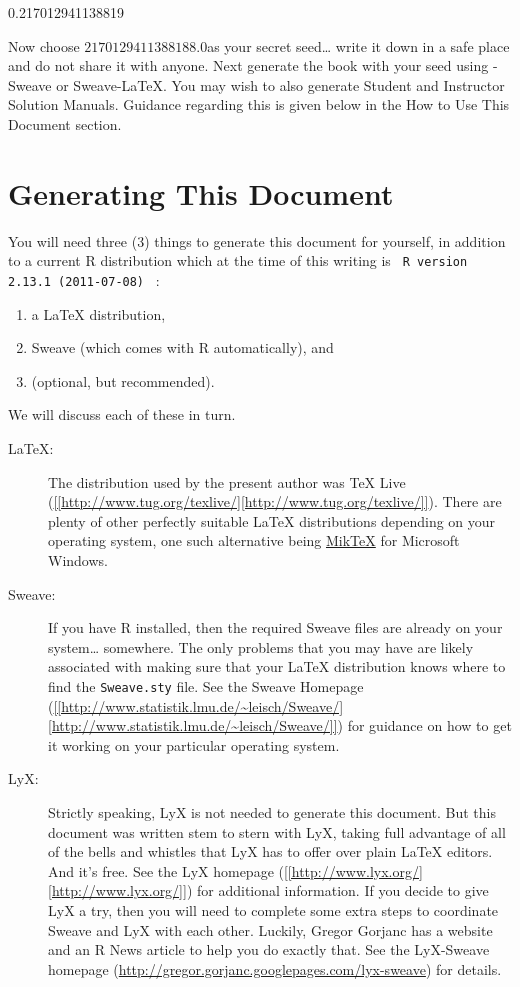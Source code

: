 \documentclass[captions=tableheading]{scrbook}
\begin{document}
0.217012941138819

Now choose \(  2170129411388188.0 \)as your secret seed\ldots{} write it down in a safe place and do not share it with anyone. Next generate the book with your seed using \LyX{}-Sweave or Sweave-\LaTeX{}. You may wish to also generate Student and Instructor Solution Manuals. Guidance regarding this is given below in the How to Use This Document section.
\section{Generating This Document \label{sec:Generating-This-Document}}
\label{sec-23-1}


You will need three (3) things to generate this document for yourself, in addition to a current \textsf{R} distribution which at the time of this writing is \texttt{  R version 2.13.1 (2011-07-08) } :
\begin{enumerate}
\item a \LaTeX{} distribution,
\item Sweave (which comes with \textsf{R} automatically), and
\item \LyX (optional, but recommended).
\end{enumerate}

We will discuss each of these in turn.

\begin{description}
\item[\LaTeX{}:] The distribution used by the present author was \TeX{} Live (\url{[[http://www.tug.org/texlive/][http://www.tug.org/texlive/]]}). There are plenty of other perfectly suitable \LaTeX{} distributions depending on your operating system, one such alternative being \href{http://miktex.org/}{MikTeX} for Microsoft Windows.
\item[Sweave:] If you have \textsf{R} installed, then the required Sweave files are already on your system\ldots{} somewhere. The only problems that you may have are likely associated with making sure that your \LaTeX{} distribution knows where to find the \texttt{Sweave.sty} file. See the Sweave Homepage (\url{[[http://www.statistik.lmu.de/~leisch/Sweave/][http://www.statistik.lmu.de/~leisch/Sweave/]]}) for guidance on how to get it working on your particular operating system.
\item[LyX:] Strictly speaking, LyX is not needed to generate this document. But this document was written stem to stern with LyX, taking full advantage of all of the bells and whistles that LyX has to offer over plain \LaTeX{} editors. And it's free. See the LyX homepage (\url{[[http://www.lyx.org/][http://www.lyx.org/]]}) for additional information. If you decide to give LyX a try, then you will need to complete some extra steps to coordinate Sweave and LyX with each other. Luckily, Gregor Gorjanc has a website and an \textsf{R} News article \cite{Gorjanc2008} to help you do exactly that. See the LyX-Sweave homepage (\url{http://gregor.gorjanc.googlepages.com/lyx-sweave}) for details.
\end{description}
\end{document}

